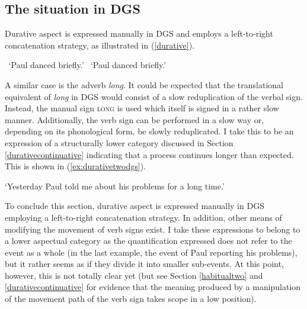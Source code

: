 \subsection{The situation in DGS}
Durative aspect is expressed manually in DGS and employs a left-to-right concatenation strategy, as illustrated in (\ref{durative}).

\begin{exe}
\ex\label{durative}\begin{xlist} 
\glt \textcolor{white}{?}`Paul danced briefly.' \label{ex:durativea}
\glt \textcolor{white}{?}`Paul danced briefly.' \label{ex:durativeb}
\end{xlist}
\end{exe} 

\noindent A similar case is the adverb \textit{long}. It could be expected that the translational equivalent of \textit{long} in DGS would consist of a slow reduplication of the verbal sign. Instead, the manual sign \textsc{long} is used which itself is signed in a rather slow manner. Additionally, the verb sign can be performed in a slow way or, depending on its phonological form, be slowly reduplicated. I take this to be an expression of a structurally lower category discussed in Section \ref{durativecontinuative} indicating that a process continues longer than expected. This is shown in (\ref{ex:durativetwodgs}).


\begin{exe}
\glt `Yesterday Paul told me about his problems for a long time.' \label{ex:durativetwodgs}
\end{exe} 

\noindent To conclude this section, durative aspect is expressed manually in DGS employing a left-to-right concatenation strategy. In addition, other means of modifying the movement of verb signs exist. I take these expressions to belong to a lower aspectual category as the quantification expressed does not refer to the event as a whole (in the last example, the event of Paul reporting his problems), but it rather seems as if they divide it into smaller sub-events. At this point, however, this is not totally clear yet (but see Section \ref{habitualtwo} and \ref{durativecontinuative} for evidence that the meaning produced by a manipulation of the movement path of the verb sign takes scope in a low position).

